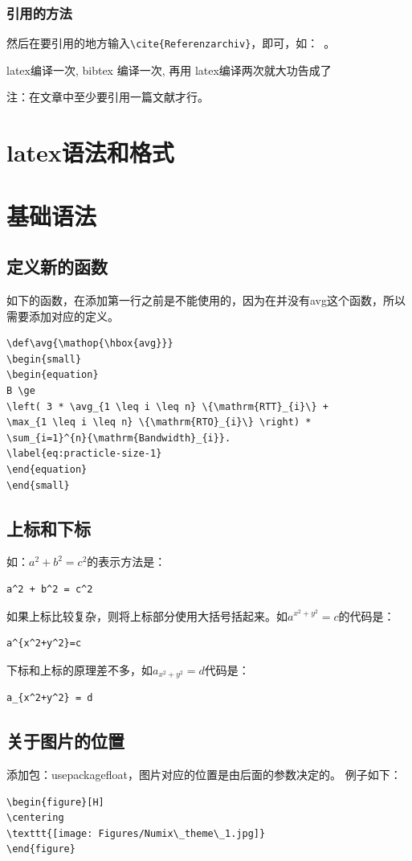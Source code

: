 \documentclass[a4paper,12pt]{ctexbook}
\begin{document}
\begin{flushleft}
\subsection{引用的方法}
然后在要引用的地方输入\verb|\cite{Referenzarchiv}|，即可，如：~\cite{LCN2002}。

latex编译一次, bibtex 编译一次, 再用 latex编译两次就大功告成了

注：在文章中至少要引用一篇文献才行。

\chapter{latex语法和格式}
\chapter{基础语法}
\section{定义新的函数}
\label{define_function}
如下的函数，在添加第一行之前是不能使用的，因为在并没有avg这个函数，所以需要添加对应的定义。
\begin{verbatim}
\def\avg{\mathop{\hbox{avg}}}
\begin{small}
\begin{equation}
B \ge
\left( 3 * \avg_{1 \leq i \leq n} \{\mathrm{RTT}_{i}\} +
\max_{1 \leq i \leq n} \{\mathrm{RTO}_{i}\} \right) *
\sum_{i=1}^{n}{\mathrm{Bandwidth}_{i}}.
\label{eq:practicle-size-1}
\end{equation}
\end{small}
\end{verbatim}

\section{上标和下标}
\label{superscript}
如：$a^2 + b^2 = c^2$的表示方法是：
\begin{verbatim}
a^2 + b^2 = c^2
\end{verbatim}
如果上标比较复杂，则将上标部分使用大括号括起来。如$a^{x^2+y^2}=c$的代码是：
\begin{verbatim}
a^{x^2+y^2}=c
\end{verbatim}
下标和上标的原理差不多，如$a_{x^2+y^2} = d$代码是：
\begin{verbatim}
a_{x^2+y^2} = d
\end{verbatim}

\section{关于图片的位置}
\label{picture_position}
添加包：usepackage{float}，图片对应的位置是由后面的参数决定的。
例子如下：
\begin{verbatim}
\begin{figure}[H]
\centering
\texttt{[image: Figures/Numix\_theme\_1.jpg]}
\end{figure}
\end{verbatim}


\end{flushleft}
\end{document}
